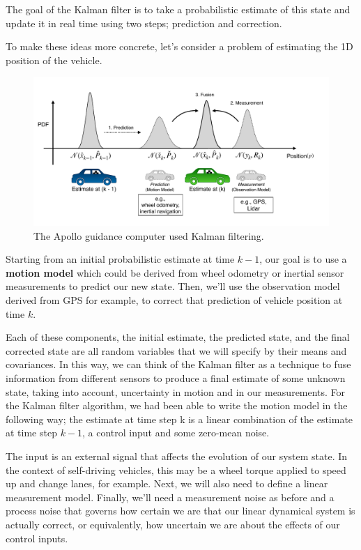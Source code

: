 The goal of the Kalman filter is to take a probabilistic estimate
of this state and update it in real time using
two steps; prediction and correction. 


To make these ideas more concrete, let's consider a problem of estimating
the 1D position of the vehicle. 

\begin{figure}[!htb]
\begin{center}
\includegraphics[scale=0.280]{img/kalman_filter/kalman_1.jpeg}
\end{center}
\caption{The Apollo guidance computer used Kalman filtering.}
\label{kalman_1}
\end{figure}

Starting from an initial probabilistic
estimate at time $k-1$, our goal is to use a \textbf{motion model}
which could be derived from wheel odometry or inertial sensor
measurements to predict our new state. Then, we'll use the observation model
derived from GPS for example, to correct that prediction
of vehicle position at time $k$. 

Each of these components, the initial estimate, the predicted state, and
the final corrected state are all random variables that we will specify
by their means and covariances. In this way, we can think of the Kalman filter as a technique to fuse information from
different sensors to produce a final estimate of some unknown state, taking into account, uncertainty
in motion and in our measurements. For the Kalman filter algorithm, we had been able to write
the motion model in the following way; the estimate at time step k is a linear combination of the estimate
at time step $k-1$, a control input and some zero-mean noise. 


The input is an external signal that affects the evolution of our system state. In the context of self-driving vehicles, this may be a wheel torque applied to speed up and change lanes, for example. Next, we will also need to define
a linear measurement model. Finally, we'll need a measurement
noise as before and a process noise that
governs how certain we are that our linear dynamical system
is actually correct, or equivalently, how uncertain we are about the effects
of our control inputs. 

